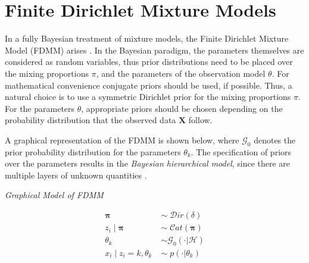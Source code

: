 \section{Finite Dirichlet Mixture Models} \label{back-fdmm-s}
In a fully Bayesian treatment of mixture models, the Finite Dirichlet Mixture Model (FDMM) arises \citep{Diebolt1994}. In the Bayesian paradigm, the parameters themselves are considered as random variables, thus prior distributions need to be placed over the mixing proportions $\pi$, and the parameters of the observation model $\theta$. For mathematical convenience conjugate priors should be used, if possible. Thus, a natural choice is to use a symmetric Dirichlet prior for the mixing proportions $\pi$. For the parameters $\theta$, appropriate priors should be chosen depending on the probability distribution that the observed data $\mathbf{X}$ follow.

A graphical representation of the FDMM is shown below, where $\mathcal{G}_{0}$ denotes the prior probability distribution for the parameters $\theta_{k}$. The specification of priors over the parameters results in the \emph{Bayesian hierarchical model}, since there are multiple layers of unknown quantities \citep{Richardson1997}. 

\vspace*{5mm}
\begin{minipage}{0.6\textwidth}%
  \hfill
  \begin{center}
	
	\emph{Graphical Model of FDMM}
  \end{center}
\end{minipage}
\begin{minipage}{0.1\textwidth}%
  \begin{equation*}
  	\begin{aligned}
  		\mathbf{\pi} \; & \sim \; \mathcal{D}ir(\delta) \\
  		z_{i} \mid \mathbf{\pi} \; & \sim \; \mathcal{C}at(\mathbf{\pi}) \\
  		\theta_{k} \; & \sim \mathcal{G}_{0}(\cdot | \mathcal{H}) \\
  		x_{i} \mid z_{i}=k,\theta_{k} \; & \sim \; p(\cdot | \theta_{k})  
  	\end{aligned} 
  \end{equation*} 
\end{minipage}
\vspace*{5mm}


